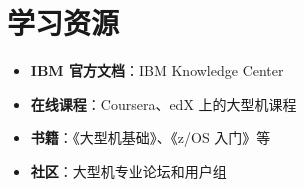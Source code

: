 \documentclass[12pt,UTF8]{ctexbook}
\begin{document}
\section{学习资源}

\begin{itemize}[leftmargin=2cm]
    \item \textbf{IBM 官方文档}：IBM Knowledge Center
    \item \textbf{在线课程}：Coursera、edX 上的大型机课程
    \item \textbf{书籍}：《大型机基础》、《z/OS 入门》等
    \item \textbf{社区}：大型机专业论坛和用户组
\end{itemize}

\backmatter
\end{document}
